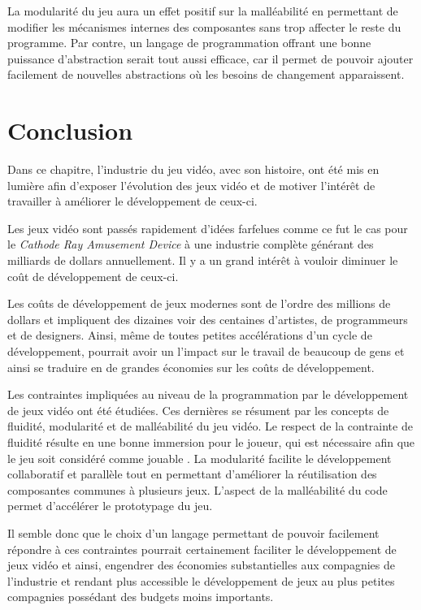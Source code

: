 \documentclass[12pt,oneside,letterpaper,francais]{book}
\begin{document}
La modularité du jeu aura un effet positif sur la malléabilité en
permettant de modifier les mécanismes internes des composantes sans
trop affecter le reste du programme. Par contre, un langage de
programmation offrant une bonne puissance d'abstraction serait tout
aussi efficace, car il permet de pouvoir ajouter facilement de
nouvelles abstractions où les besoins de changement apparaissent.


\section{Conclusion}
Dans ce chapitre, l'industrie du jeu vidéo, avec son histoire, ont été
mis en lumière afin d'exposer l'évolution des jeux vidéo et de motiver
l'intérêt de travailler à améliorer le développement de ceux-ci.

Les jeux vidéo sont passés rapidement d'idées farfelues comme ce fut
le cas pour le \textit{Cathode Ray Amusement Device} à une industrie
complète générant des milliards de dollars annuellement. Il y a un
grand intérêt à vouloir diminuer le coût de développement de
ceux-ci. 

Les coûts de développement de jeux modernes sont de l'ordre des
millions de dollars et impliquent des dizaines voir des centaines
d'artistes, de programmeurs et de designers. Ainsi, même de toutes
petites accélérations d'un cycle de développement, pourrait avoir un
l'impact sur le travail de beaucoup de gens et ainsi se traduire en
de grandes économies sur les coûts de développement.

Les contraintes impliquées au niveau de la programmation par le
développement de jeux vidéo ont été étudiées. Ces dernières se
résument par les concepts de fluidité, modularité et de malléabilité
du jeu vidéo. Le respect de la contrainte de fluidité résulte en une
bonne immersion pour le joueur, qui est nécessaire afin que le jeu
soit considéré comme \og jouable \fg. La modularité facilite le
développement collaboratif et parallèle tout en permettant d'améliorer
la réutilisation des composantes communes à plusieurs jeux. L'aspect
de la malléabilité du code permet d'accélérer le prototypage du jeu.

Il semble donc que le choix d'un langage permettant de pouvoir
facilement répondre à ces contraintes pourrait certainement faciliter
le développement de jeux vidéo et ainsi, engendrer des économies
substantielles aux compagnies de l'industrie et rendant plus
accessible le développement de jeux au plus petites compagnies
possédant des budgets moins importants.
\end{document}
